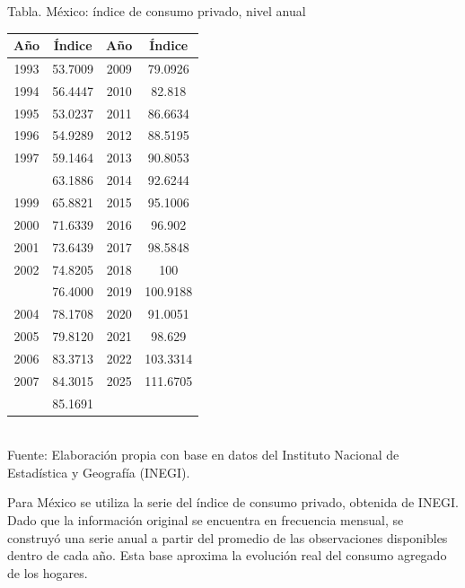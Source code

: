 \documentclass{article}\usepackage[]{graphicx}\usepackage[]{xcolor}
\begin{document}
\begin{center}
Tabla. México: índice de consumo privado, nivel anual
\end{center}
\begin{center}

\begin{tabular}{cccc}
\toprule
Año & Índice & Año & Índice\\
\midrule
1993 & 53.7009 & 2009 & 79.0926\\
1994 & 56.4447 & 2010 & 82.818\\
1995 & 53.0237 & 2011 & 86.6634\\
1996 & 54.9289 & 2012 & 88.5195\\
1997 & 59.1464 & 2013 & 90.8053\\
\addlinespace
1998 & 63.1886 & 2014 & 92.6244\\
1999 & 65.8821 & 2015 & 95.1006\\
2000 & 71.6339 & 2016 & 96.902\\
2001 & 73.6439 & 2017 & 98.5848\\
2002 & 74.8205 & 2018 & 100\\
\addlinespace
2003 & 76.4000 & 2019 & 100.9188\\
2004 & 78.1708 & 2020 & 91.0051\\
2005 & 79.8120 & 2021 & 98.629\\
2006 & 83.3713 & 2022 & 103.3314\\
2007 & 84.3015 & 2025 & 111.6705\\
\addlinespace
2008 & 85.1691 &  & \\
\bottomrule
\end{tabular}
\\[0.3em]
{\footnotesize Fuente: Elaboración propia con base en datos del Instituto Nacional de Estadística y Geografía (INEGI).}
\end{center}


Para México se utiliza la serie del índice de consumo privado, obtenida de INEGI. Dado que la información original se encuentra en frecuencia mensual, se construyó una serie anual a partir del promedio de las observaciones disponibles dentro de cada año. Esta base aproxima la evolución real del consumo agregado de los hogares.
\end{document}
